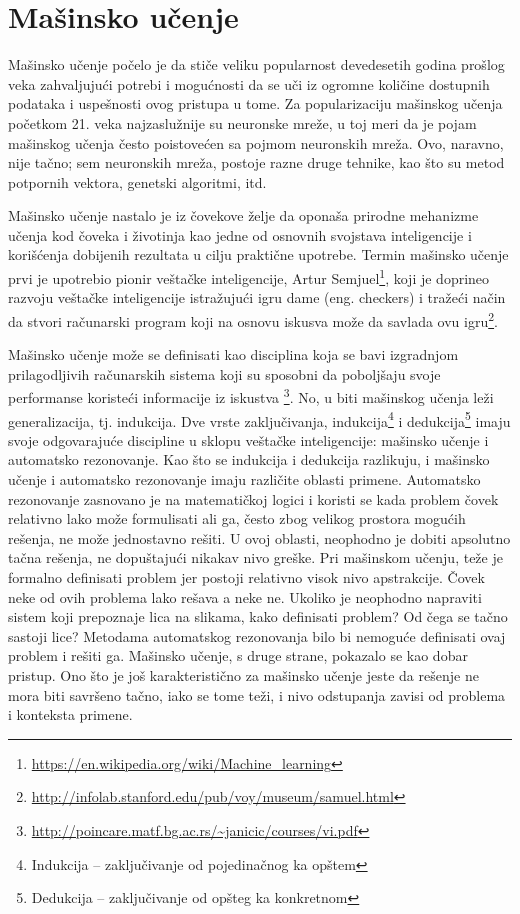 \chapter{Mašinsko učenje}

Mašinsko učenje počelo je da stiče veliku popularnost devedesetih godina prošlog veka zahvaljujući potrebi i mogućnosti da se uči iz ogromne količine dostupnih podataka i uspešnosti ovog pristupa u tome. Za popularizaciju mašinskog učenja početkom 21. veka najzaslužnije su neuronske mreže, u toj meri da je pojam mašinskog učenja često poistovećen sa pojmom neuronskih mreža. Ovo, naravno, nije tačno; sem neuronskih mreža, postoje razne druge tehnike, kao što su metod potpornih vektora, genetski algoritmi, itd. \par

Mašinsko učenje nastalo je iz čovekove želje da oponaša prirodne mehanizme učenja kod čoveka i životinja kao jedne od osnovnih svojstava inteligencije i korišćenja dobijenih rezultata u cilju praktične upotrebe. Termin mašinsko učenje prvi je upotrebio pionir veštačke inteligencije, Artur Semjuel\footnote{\url{https://en.wikipedia.org/wiki/Machine_learning}}, koji je doprineo razvoju veštačke inteligencije istražujući igru dame (eng. checkers) i tražeći način da stvori računarski program koji na osnovu iskusva može da savlada ovu igru\footnote{\url{http://infolab.stanford.edu/pub/voy/museum/samuel.html}}. \par

Mašinsko učenje može se definisati kao disciplina koja se bavi izgradnjom prilagodljivih računarskih sistema koji su sposobni da poboljšaju svoje performanse koristeći informacije iz iskustva \footnote{\url{http://poincare.matf.bg.ac.rs/~janicic/courses/vi.pdf}}. No, u biti mašinskog učenja leži generalizacija, tj. indukcija. Dve vrste zaključivanja, indukcija\footnote{Indukcija -- zaključivanje od pojedinačnog ka opštem} i dedukcija\footnote{Dedukcija -- zaključivanje od opšteg ka konkretnom} imaju svoje odgovarajuće discipline u sklopu veštačke inteligencije: mašinsko učenje i automatsko rezonovanje. Kao što se indukcija i dedukcija razlikuju, i mašinsko učenje i automatsko rezonovanje imaju različite oblasti primene. Automatsko rezonovanje zasnovano je na matematičkoj logici i koristi se kada problem čovek relativno lako može formulisati ali ga, često zbog velikog prostora mogućih rešenja, ne može jednostavno rešiti. U ovoj oblasti, neophodno je dobiti apsolutno tačna rešenja, ne dopuštajući nikakav nivo greške.
Pri mašinskom učenju, teže je formalno definisati problem jer postoji relativno visok nivo apstrakcije. Čovek neke od ovih problema lako rešava a neke ne. Ukoliko je neophodno napraviti sistem koji prepoznaje lica na slikama, kako definisati problem? Od čega se tačno sastoji lice? Metodama automatskog rezonovanja bilo bi nemoguće definisati ovaj problem i rešiti ga. Mašinsko učenje, s druge strane, pokazalo se kao dobar pristup. Ono što je još karakteristično za mašinsko učenje jeste da rešenje ne mora biti savršeno tačno, iako se tome teži, i nivo odstupanja zavisi od problema i konteksta primene. \par



